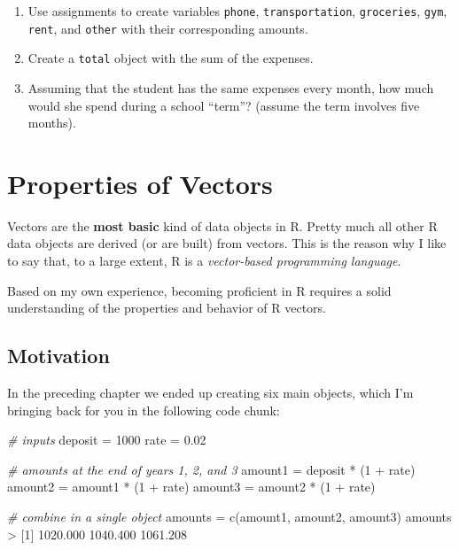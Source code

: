 \documentclass[
]{book}
\newenvironment{Shaded}{\begin{snugshade}}{\end{snugshade}}
\newcommand{\CommentTok}[1]{\textcolor[rgb]{0.56,0.35,0.01}{\textit{#1}}}
\newcommand{\DecValTok}[1]{\textcolor[rgb]{0.00,0.00,0.81}{#1}}
\newcommand{\FloatTok}[1]{\textcolor[rgb]{0.00,0.00,0.81}{#1}}
\newcommand{\FunctionTok}[1]{\textcolor[rgb]{0.00,0.00,0.00}{#1}}
\newcommand{\NormalTok}[1]{#1}
\newcommand{\OtherTok}[1]{\textcolor[rgb]{0.56,0.35,0.01}{#1}}
\newcommand{\SpecialCharTok}[1]{\textcolor[rgb]{0.00,0.00,0.00}{#1}}
\begin{document}
\begin{enumerate}
\def\labelenumi{\alph{enumi})}
\item
  Use assignments to create variables \texttt{phone}, \texttt{transportation}, \texttt{groceries},
  \texttt{gym}, \texttt{rent}, and \texttt{other} with their corresponding amounts.
\item
  Create a \texttt{total} object with the sum of the expenses.
\item
  Assuming that the student has the same expenses every month, how much would
  she spend during a school ``term''? (assume the term involves five months).
\end{enumerate}

\hypertarget{vectors2}{%
\chapter{Properties of Vectors}\label{vectors2}}

Vectors are the \textbf{most basic} kind of data objects in R. Pretty much all other
R data objects are derived (or are built) from vectors. This is the reason why
I like to say that, to a large extent, R is a
\emph{vector-based programming language}.

Based on my own experience, becoming proficient in R requires a solid
understanding of the properties and behavior of R vectors.

\hypertarget{motivation}{%
\section{Motivation}\label{motivation}}

In the preceding chapter we ended up creating six main objects, which I'm
bringing back for you in the following code chunk:

\begin{Shaded}
\begin{Highlighting}[]
\CommentTok{\# inputs}
\NormalTok{deposit }\OtherTok{=} \DecValTok{1000}
\NormalTok{rate }\OtherTok{=} \FloatTok{0.02}

\CommentTok{\# amounts at the end of years 1, 2, and 3}
\NormalTok{amount1 }\OtherTok{=}\NormalTok{ deposit }\SpecialCharTok{*}\NormalTok{ (}\DecValTok{1} \SpecialCharTok{+}\NormalTok{ rate)}
\NormalTok{amount2 }\OtherTok{=}\NormalTok{ amount1 }\SpecialCharTok{*}\NormalTok{ (}\DecValTok{1} \SpecialCharTok{+}\NormalTok{ rate)}
\NormalTok{amount3 }\OtherTok{=}\NormalTok{ amount2 }\SpecialCharTok{*}\NormalTok{ (}\DecValTok{1} \SpecialCharTok{+}\NormalTok{ rate)}

\CommentTok{\# combine in a single object}
\NormalTok{amounts }\OtherTok{=} \FunctionTok{c}\NormalTok{(amount1, amount2, amount3)}
\NormalTok{amounts}
\SpecialCharTok{\textgreater{}}\NormalTok{ [}\DecValTok{1}\NormalTok{] }\FloatTok{1020.000} \FloatTok{1040.400} \FloatTok{1061.208}
\end{Highlighting}
\end{Shaded}
\end{document}
